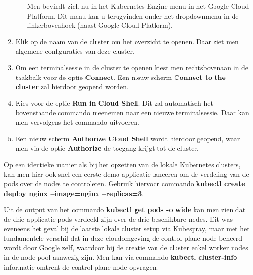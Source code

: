 \begin{enumerate}
\begin{enumerate}
        \newline Men bevindt zich nu in het Kubernetes Engine menu in het Google Cloud Platform. Dit menu kan u terugvinden onder het dropdownmenu in de linkerbovenhoek (naast Google Cloud Platform).
    \end{enumerate}    
    \item Klik op de naam van de cluster om het overzicht te openen. Daar ziet men algemene configuraties van deze cluster.
    \item Om een terminalsessie in de cluster te openen kiest men rechtsbovenaan in de taakbalk voor de optie {\bf Connect}. Een nieuw scherm {\bf Connect to the cluster} zal hierdoor geopend worden.
    \item Kies voor de optie {\bf Run in Cloud Shell}. Dit zal automatisch het bovenstaande commando meenemen naar een nieuwe terminalsessie. Daar kan men vervolgens het commando uitvoeren.
    \item Een nieuw scherm {\bf Authorize Cloud Shell} wordt hierdoor geopend, waar men via de optie {\bf Authorize} de toegang krijgt tot de cluster.   
\end{enumerate} 

Op een identieke manier als bij het opzetten van de lokale Kubernetes clusters, kan men hier ook snel een eerste demo-applicatie lanceren om de verdeling van de pods over de nodes te controleren. Gebruik hiervoor commando {\bf kubectl create deploy nginx --image=nginx --replicas=3}.

Uit de output van het commando {\bf kubectl get pods -o wide} kan men zien dat de drie applicatie-pods verdeeld zijn over de drie beschikbare nodes. Dit was eveneens het geval bij de laatste lokale cluster setup via Kubespray, maar met het fundamentele verschil dat in deze cloudomgeving de control-plane node beheerd wordt door Google zelf, waardoor bij de creatie van de cluster enkel worker nodes in de node pool aanwezig zijn. Men kan via commando {\bf kubectl cluster-info} informatie omtrent de control plane node opvragen. 

